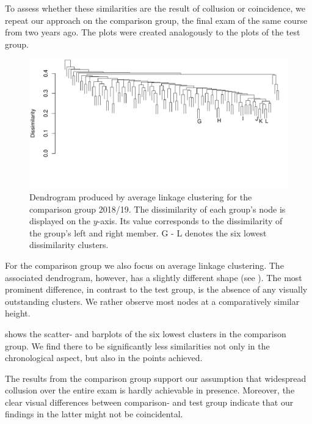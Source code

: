 \documentclass{edm_article}
\begin{document}
To assess whether these similarities are the result of collusion or coincidence, we repeat our approach on the comparison group, the final exam of the same course from two years ago. The plots were created analogously to the plots of the test group.

\begin{figure}
	\includegraphics[width = \textwidth]{dendro_18_19_anon_av_02.pdf}
	\caption{Dendrogram produced by average linkage clustering for the comparison group 2018/19. The dissimilarity of each group's node is displayed on the $y$-axis. Its value corresponds to the dissimilarity of the group's left and right member. G - L denotes the six lowest dissimilarity clusters.}
	\label{fig:tree_cl_18_19}
\end{figure}

For the comparison group we also focus on average linkage clustering. The associated dendrogram, however, has a slightly different shape (see ). The most prominent difference, in contrast to the test group, is the absence of any visually outstanding clusters. We rather observe most nodes at a comparatively similar height.

 shows the scatter- and barplots of the six lowest clusters in the comparison group. We find there to be significantly less similarities not only in the chronological aspect, but also in the points achieved. 

The results from the comparison group support our assumption that widespread collusion over the entire exam is hardly achievable in presence. Moreover, the clear visual differences between comparison- and test group indicate that our findings in the latter might not be coincidental. 
\end{document}
